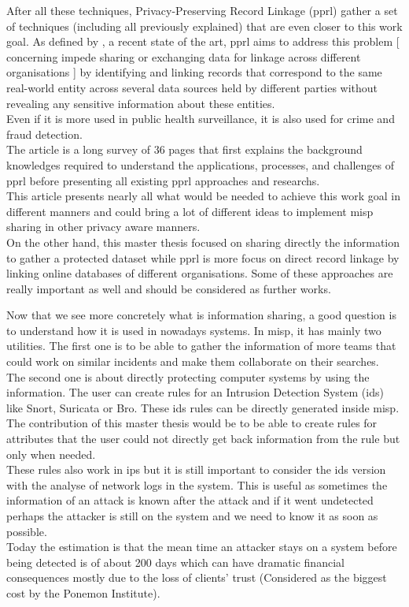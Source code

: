 \documentclass{eplmastersthesis}
\begin{document}
After all these techniques, Privacy-Preserving Record Linkage (\gls{pprl}) gather a set of techniques (including all previously explained) that are even closer to this work goal. As defined by \cite{vatsalanprivacy}, a recent state of the art, \gls{pprl} aims to address this problem [ concerning impede sharing or exchanging data for linkage across different organisations ] by identifying and linking records that correspond to the same real-world entity across several data sources held by different parties without revealing any sensitive information about these entities.\\
Even if it is more used in public health surveillance, it is also used for crime and fraud detection.\\
The article is a long survey of 36 pages that first explains the background knowledges required to understand the applications, processes, and challenges of \gls{pprl} before presenting all existing \gls{pprl} approaches and researchs.\\
This article presents nearly all what would be needed to achieve this work goal in different manners and could bring a lot of different ideas to implement \gls{misp} sharing in other privacy aware manners.\\
On the other hand, this master thesis focused on sharing directly the information to gather a protected dataset while \gls{pprl} is more focus on direct record linkage by linking online databases of different organisations. Some of these approaches are really important as well and should be considered as further works.

Now that we see more concretely what is information sharing, a good question is to understand how it is used in nowadays systems. In \gls{misp}, it has mainly two utilities. The first one is to be able to gather the information of more teams that could work on similar incidents and make them collaborate on their searches.\\
The second one is about directly protecting computer systems by using the information. The user can create rules for an Intrusion Detection System (\gls{ids}) like Snort, Suricata or Bro. These \gls{ids} rules can be directly generated inside \gls{misp}. The contribution of this master thesis would be to be able to create rules for attributes that the user could not directly get back information from the rule but only when needed.\\
These rules also work in \gls{ips} but it is still important to consider the \gls{ids} version with the analyse of network logs in the system. This is useful as sometimes the information of an attack is known after the attack and if it went undetected perhaps the attacker is still on the system and we need to know it as soon as possible.\\
Today the estimation is that the mean time an attacker stays on a system before being detected is of about 200 days which can have dramatic financial consequences mostly due to the loss of clients' trust (Considered as the biggest cost by the Ponemon Institute).\\
\end{document}
